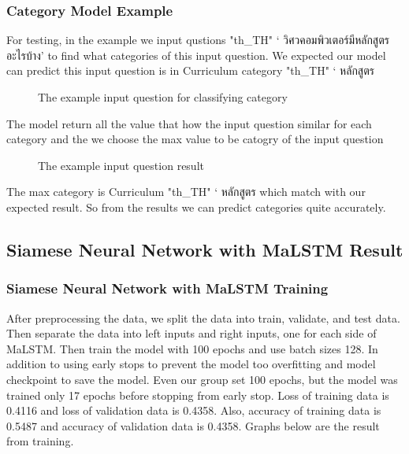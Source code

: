 \documentclass[12pt,oneside,openright,a4paper]{cpe-english-project}
\begin{document}
\subsubsection{Category Model Example}
For testing, in the example we input qustions {
\XeTeXlinebreaklocale "th_TH"	
\thaifont 
 ‘ วิศวคอมพิวเตอร์มีหลักสูตรอะไรบ้าง’ }to find what categories of this input question. We expected our model can predict this input question is in Curriculum category  {
\XeTeXlinebreaklocale "th_TH"	
\thaifont 
 ‘ หลักสูตร } 
\begin{figure}[!h]\centering
{}
\caption{The example input question for classifying category}\label{fig:The example input question for classifying category}
\end{figure}
The model return all the value that how the input question similar for each category and the we choose the max value to be catogry of the input question
\begin{figure}[!h]\centering
{}
\caption{The example input question result}\label{fig:The example input question result}
\end{figure}
\pagebreak
The max category is Curriculum {
\XeTeXlinebreaklocale "th_TH"	
\thaifont 
 ‘ หลักสูตร } which match with our expected result. So from the results we can predict categories quite accurately. 
\subsection{Siamese Neural Network with MaLSTM Result}
\subsubsection{Siamese Neural Network with MaLSTM Training}
After preprocessing the data, we split the data into train, validate, and test data. Then separate the data into left inputs and right inputs, one for each side of MaLSTM. Then train the model with 100 epochs and use batch sizes 128. In addition to using early stops to prevent the model too overfitting and model checkpoint to save the model. Even our group set 100 epochs, but the model was trained only 17 epochs before stopping from early stop. Loss of training data is 0.4116 and loss of validation data is 0.4358. Also, accuracy of training data is 0.5487 and accuracy of validation data is 0.4358. Graphs below are the result from training.
\end{document}
